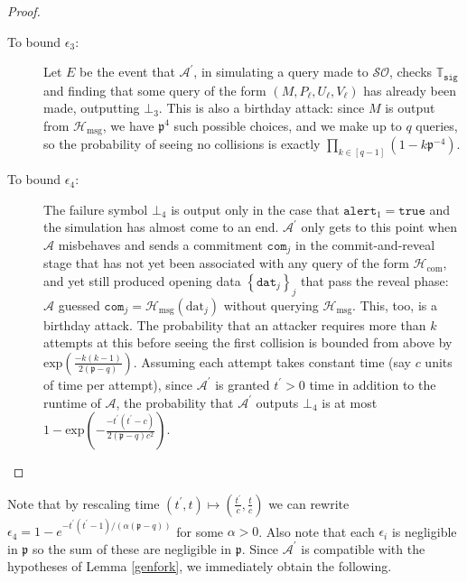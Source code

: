 \documentclass{iacrtrans}
\theoremstyle{definition}
\numberwithin{theorem}{subsection}
\numberwithin{lemma}{theorem}
\newcommand{\adversary}{\mathcal{A}}
\begin{document}
\begin{proof}
\begin{description}
\item [To bound $\epsilon_3$:] Let $E$ be the event that $\adversary^\prime$, in simulating a query made to $\mathcal{SO}$, checks $\mathbb{T}_{\texttt{sig}}$ and finding that some query of the form $(M, P_\ell, U_\ell, V_\ell)$ has already been made, outputting $\bot_3$. This is also a birthday attack: since $M$ is output from $\mathcal{H}_{\text{msg}}$, we have $\mathfrak{p}^{4}$ such possible choices, and we make up to $q$ queries, so the probability of seeing no collisions is exactly $\prod_{k \in [q-1]}(1 - k\mathfrak{p}^{-4})$.



\item [To bound $\epsilon_4$:] The failure symbol $\bot_4$ is output only in the case that $\texttt{alert}_1 = \texttt{true}$ and the simulation has almost come to an end. $\adversary^\prime$ only gets to this point when $\adversary$ misbehaves and sends a commitment $\texttt{com}_j$ in the commit-and-reveal stage that has not yet been associated with any query of the form $\mathcal{H}_{\text{com}}$, and yet still produced opening data $\left\{\texttt{dat}_j\right\}_j$ that pass the reveal phase:  $\adversary$ guessed $\texttt{com}_j = \mathcal{H}_{\text{msg}}(\text{dat}_j)$ without querying $\mathcal{H}_{\text{msg}}$. This, too, is a birthday attack. The probability that an attacker requires more than $k$ attempts at this before seeing the first collision is bounded from above by $\text{exp}(\frac{-k(k-1)}{2(\mathfrak{p}-q)})$. Assuming each attempt takes constant time (say $c$ units of time per attempt), since $\adversary^\prime$ is granted $t^\prime > 0$ time in addition to the runtime of $\adversary$, the probability that $\adversary^\prime$ outputs $\bot_4$ is at most $1 - \text{exp}(-\frac{-t^\prime(t^\prime-c)}{2(\mathfrak{p}-q)c^2})$. 




\end{description}


\end{proof}


Note that by rescaling time $(t^\prime, t) \mapsto (\frac{t^\prime}{c}, \frac{t}{c})$ we can rewrite $\epsilon_4 = 1 - e^{-t^\prime(t^\prime - 1)/(\alpha(\mathfrak{p} - q))}$ for some $\alpha > 0$.  Also note that each $\epsilon_i$ is negligible in $\mathfrak{p}$ so the sum of these are negligible in $\mathfrak{p}$. Since $\adversary^\prime$ is compatible with the hypotheses of Lemma \ref{genfork}, we immediately obtain the following.
\end{document}
